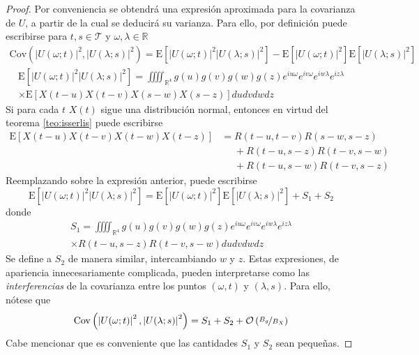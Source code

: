 \documentclass[12pt,letterpaper]{book}
\newcommand{\R}{\mathbb{R}}
\newcommand{\E}[1]{\mathrm{E}\left[ #1 \right]}
\newcommand{\Cov}[1]{\mathrm{Cov}\left( #1 \right)}
\newcommand{\abso}[1]{\left| #1 \right|}
\newcommand{\orden}[1]{\mathcal{O}\left( #1 \right)}
\newcommand{\pheq}{\phantom{=}}
\begin{document}
\begin{proof}
Por conveniencia se obtendrá una expresión aproximada para la covarianza de $U$, a partir de la cual se deducirá su varianza. 
%
Para ello, por definición puede escribirse para $t,s \in \mathcal{T}$ y $\omega, \lambda \in \R$
\begin{align*}
\Cov{\abso{U(\omega;t)}^{2},\abso{U(\lambda;s)}^{2}} =
\E{\abso{U(\omega;t)}^{2} \abso{U(\lambda;s)}^{2}} - 
\E{\abso{U(\omega;t)}^{2}} \E{\abso{U(\lambda;s)}^{2}}
\end{align*}
\begin{multline}
\E{\abso{U(\omega;t)}^{2} \abso{U(\lambda;s)}^{2}}
=
\iiiint_{\R^{4}} g(u) g(v) g(w) g(z) e^{i u \omega} e^{i v \omega} e^{i w \lambda} e^{i z \lambda} \\
 \times
\E{{X(t-u)} {X(t-v)} {X(s-w)} {X(s-z)}}
du dv dw dz 
\end{multline}
Si para cada $t$ $X(t)$ sigue una distribución normal, entonces en virtud del teorema \ref{teo:isserlis} puede escribirse
\begin{align*}
\E{X(t-u) {X(t-v)} {X(t-w)} X(t-z)} 
&=       R(t-u,t-v)R(s-w,s-z) \\
&\pheq + R(t-u,s-z)R(t-v,s-w) \\
&\pheq + R(t-u,s-w)R(t-v,s-z)
\end{align*}
Reemplazando sobre la expresión anterior, puede escribirse
\begin{equation}
\E{\abso{U(\omega;t)}^{2} \abso{U(\lambda;s)}^{2}} = \E{\abso{U(\omega;t)}^{2}} \E{\abso{U(\lambda;s)}^{2}}+ S_1 + S_2
\end{equation}
donde
\begin{multline*}
S_1 = \iiiint_{\R^{4}} g(u) g(v) g(w) g(z) e^{i u \omega} e^{i v \omega} e^{i w \lambda} e^{i z \lambda} \\
\times
R(t-u,s-z)R(t-v,s-w)
du dv dw dz 
\end{multline*}
Se define a $S_2$ de manera similar, intercambiando $w$ y $z$. 
%
Estas expresiones, de apariencia innecesariamente complicada, pueden interpretarse como las \textit{interferencias} de la covarianza entre los puntos $(\omega, t)$ y $(\lambda,s)$.
%
Para ello, nótese que
\begin{equation}
\Cov{\abso{U(\omega;t)}^{2},\abso{U(\lambda;s)}^{2}} = S_1 + S_2 + \orden{\nicefrac{B_g}{B_X}}
\end{equation}
%
Cabe mencionar que es conveniente que las cantidades $S_1$ y $S_2$ sean pequeñas.


\end{proof}
\end{document}
